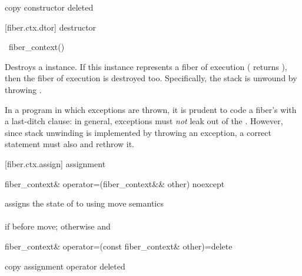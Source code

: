 \begin{itemdescr}
\pnum
copy constructor deleted
\end{itemdescr}



[fiber.ctx.dtor]{ destructor}

\begin{itemdecl}
~fiber_context()
\end{itemdecl}

\begin{itemdescr}
\pnum
Destroys a \fiber instance. If this instance represents a fiber of execution
( returns ), then the fiber of execution is destroyed
too. Specifically, the stack is unwound by throwing \unwindex.\\
\begin{note}In a program in which exceptions are thrown, it is prudent to code a
fiber's \entryfn\xspace with a last-ditch  clause:
in general, exceptions must \emph{not} leak out of the \entryfn. However, since
stack unwinding is implemented by throwing an exception, a correct \entryfn
{} statement must also 
and rethrow it.\end{note}
\end{itemdescr}



[fiber.ctx.assign]{ assignment}

\begin{itemdecl}
fiber_context& operator=(fiber_context&& other) noexcept
\end{itemdecl}

\begin{itemdescr}
\pnum
assigns the state of  to  using move semantics\\
\returns {}\\
\postconditions {} if  before move; otherwise
 and 
\end{itemdescr}

\begin{itemdecl}
fiber_context& operator=(const fiber_context& other)=delete
\end{itemdecl}

\begin{itemdescr}
\pnum
copy assignment operator deleted
\end{itemdescr}



